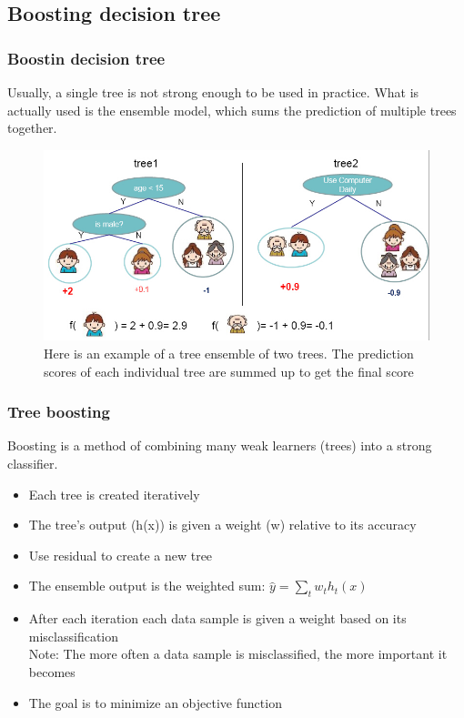 \documentclass{beamer}
\begin{document}
\subsection{Boosting decision tree}
\begin{frame}
\frametitle{Boostin decision tree}
Usually, a single tree is not strong enough to be used in practice. What is actually used is the ensemble model, which sums the prediction of multiple trees together.
\begin{figure}
\includegraphics[scale=0.40]{./figures/boosting}
\caption{Here is an example of a tree ensemble of two trees. The prediction scores of each individual tree are summed up to get the final score}
\end{figure}
\end{frame}
\begin{frame}
\frametitle{Tree boosting}
Boosting is a method of combining many weak learners (trees) into a strong classifier.
\begin{itemize}
\item Each tree is created iteratively
\item The tree’s output (h(x)) is given a weight (w) relative to its accuracy
\item Use residual to create a new tree
\item The ensemble output is the weighted sum:  $\hat{y}=\sum_{t}w_{t} h_{t}(x)$
\item After each iteration each data sample is given a weight based on its misclassification\\
Note: The more often a data sample is misclassified, the more important it becomes 
\item The goal is to minimize an objective function
\end{itemize}
\end{frame}
\end{document}
